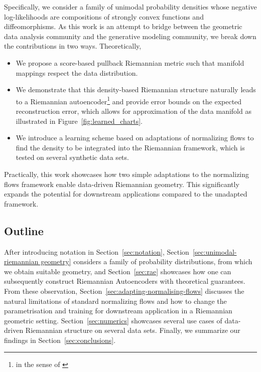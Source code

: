 Specifically, we consider a family of unimodal probability densities whose negative log-likelihoods are compositions of strongly convex functions and diffeomorphisms. As this work is an attempt to bridge between the geometric data analysis community and the generative modeling community, we break down the contributions in two ways.
Theoretically,
\begin{itemize}
    \item We propose a score-based pullback Riemannian metric such that manifold mappings respect the data distribution.
    \item We demonstrate that this density-based Riemannian structure naturally leads to a Riemannian autoencoder\footnote{in the sense of \cite{diepeveen2024pulling}} and provide error bounds on the expected reconstruction error, which allows for approximation of the data manifold as illustrated in Figure~\ref{fig:learned_charts}.
    \item We introduce a learning scheme based on adaptations of normalizing flows to find the density to be integrated into the Riemannian framework, which is tested on several synthetic data sets. 
\end{itemize}
Practically, this work showcases how two simple adaptations to the normalizing flows framework enable data-driven Riemannian geometry. This significantly expands the potential for downstream applications compared to the unadapted framework.


\subsection{Outline}

After introducing notation in Section~\ref{sec:notation}, Section~\ref{sec:unimodal-riemannian geometry} considers a family of probability distributions, from which we obtain suitable geometry, and Section~\ref{sec:rae} showcases how one can subsequently construct Riemannian Autoencoders with theoretical guarantees. From these observation, Section~\ref{sec:adapting-normalising-flows} discusses the natural limitations of standard normalizing flows and how to change the parametrisation and training for downstream application in a Riemannian geometric setting. Section~\ref{sec:numerics} showcases several use cases of data-driven Riemannian structure on several data sets. Finally, we summarize our findings in Section~\ref{sec:conclusions}.


